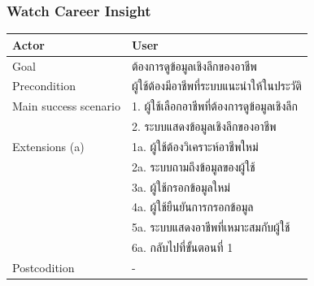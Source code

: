 \subsubsection{Watch Career Insight}
\begin{table}[H]
    \begin{tabular*}{\textwidth}{l|l} \hline
        Actor                 & User                  \\ \hline
        Goal                  & ต้องการดูข้อมูลเชิงลึกของอาชีพ         \\ \hline
        Precondition          & ผู้ใช้ต้องมีอาชีพที่ระบบแนะนำให้ในประวัติ          \\ \hline
        Main success scenario & 1. ผู้ใช้เลือกอาชีพที่ต้องการดูข้อมูลเชิงลึก \\
        & 2. ระบบแสดงข้อมูลเชิงลึกของอาชีพ     \\ \hline
        Extensions (a)        & 1a. ผู้ใช้ต้องวิเคราะห์อาชีพใหม่        \\
        & 2a. ระบบถามถึงข้อมูลของผู้ใช้         \\
        & 3a. ผู้ใช้กรอกข้อมูลใหม่              \\
        & 4a. ผู้ใช้ยืนยันการกรอกข้อมูล          \\
        & 5a. ระบบแสดงอาชีพที่เหมาะสมกับผู้ใช้   \\
        & 6a. กลับไปที่ขั้นตอนที่ 1              \\ \hline
        Postcodition          & -                               \\ \hline
    \end{tabular*}
\end{table}




